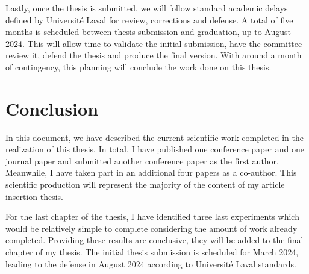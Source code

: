 \documentclass[12pt,letterpaper,oneside]{article}
\begin{document}
Lastly, once the thesis is submitted, we will follow standard academic delays defined by Université Laval for review, corrections and defense.
A total of five months is scheduled between thesis submission and graduation, up to August 2024.
This will allow time to validate the initial submission, have the committee review it, defend the thesis and produce the final version.
With around a month of contingency, this planning will conclude the work done on this thesis.

\section{Conclusion}
\label{sec:conclusion}

In this document, we have described the current scientific work completed in the realization of this thesis.
In total, I have published one conference paper and one journal paper and submitted another conference paper as the first author.
Meanwhile, I have taken part in an additional four papers as a co-author.
This scientific production will represent the majority of the content of my article insertion thesis.

For the last chapter of the thesis, I have identified three last experiments which would be relatively simple to complete considering the amount of work already completed.
Providing these results are conclusive, they will be added to the final chapter of my thesis.
The initial thesis submission is scheduled for March 2024, leading to the defense in August 2024 according to Université Laval standards.


\printbibliography
\newpage





%
\end{document}
